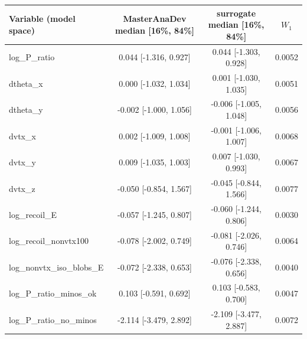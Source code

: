 \begin{tabular}{lccc}
\toprule
Variable (model space) & MasterAnaDev median [16\%, 84\%] & surrogate median [16\%, 84\%] & $W_1$ \\
\midrule
log\_P\_ratio & 0.044 [-1.316, 0.927] & 0.044 [-1.303, 0.928] & 0.0052 \\
dtheta\_x & 0.000 [-1.032, 1.034] & 0.001 [-1.030, 1.035] & 0.0051 \\
dtheta\_y & -0.002 [-1.000, 1.056] & -0.006 [-1.005, 1.048] & 0.0056 \\
dvtx\_x & 0.002 [-1.009, 1.008] & -0.001 [-1.006, 1.007] & 0.0068 \\
dvtx\_y & 0.009 [-1.035, 1.003] & 0.007 [-1.030, 0.993] & 0.0067 \\
dvtx\_z & -0.050 [-0.854, 1.567] & -0.045 [-0.844, 1.566] & 0.0077 \\
log\_recoil\_E & -0.057 [-1.245, 0.807] & -0.060 [-1.244, 0.806] & 0.0030 \\
log\_recoil\_nonvtx100 & -0.078 [-2.002, 0.749] & -0.081 [-2.026, 0.746] & 0.0064 \\
log\_nonvtx\_iso\_blobs\_E & -0.072 [-2.338, 0.653] & -0.076 [-2.338, 0.656] & 0.0040 \\
log\_P\_ratio\_minos\_ok & 0.103 [-0.591, 0.692] & 0.103 [-0.583, 0.700] & 0.0047 \\
log\_P\_ratio\_no\_minos & -2.114 [-3.479, 2.892] & -2.109 [-3.477, 2.887] & 0.0072 \\
\bottomrule
\end{tabular}
